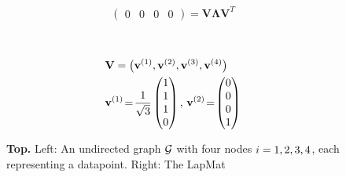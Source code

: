{{\begin{figure}[H]
\begin{center}
\begin{minipage}{0.4\textwidth}
\begin{equation}
\begin{pmatrix}
							0 & 0 & 0 & 0 
						\end{pmatrix}\!=\!\mathbf{V} {\bm \Lambda} \mathbf{V}^{T}  
						\nonumber
					\end{equation} 
				\end{minipage}
				\vspace*{20mm}\\
				  \begin{minipage}{0.4\textwidth}
				\end{minipage} 
    		\begin{minipage}{0.4\textwidth}
										\begin{align}
											& \mathbf{V} = \big( {\bf v}^{(1)},{\bf v}^{(2)},{\bf v}^{(3)},{\bf v}^{(4)} \big) \nonumber \\
											&	\mathbf{v}^{(1)}\!=\!\frac{1}{\sqrt{3}} \begin{pmatrix} 1 \\ 1 \\ 1 \\ 0 \end{pmatrix}, \,
												\mathbf{v}^{(2)}\!=\!\begin{pmatrix} 0 \\ 0 \\ 0 \\ 1 \end{pmatrix} \nonumber 
												\end{align}
				\end{minipage} 
				\caption{\label{fig_lap_mtx_specclustering_dict} {\bf Top.} Left: An undirected \gls{graph} 
					$\mathcal{G}$ with four nodes $i=1,2,3,4$, each representing a \gls{datapoint}. Right: The \gls{LapMat} 
}
\end{center}
\end{figure}}}
